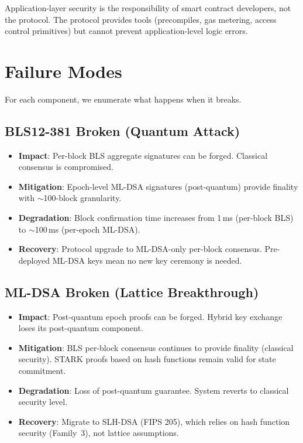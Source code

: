 \documentclass[11pt,a4paper]{article}
\begin{document}
Application-layer security is the responsibility of smart contract developers, not the
protocol. The protocol provides tools (precompiles, gas metering, access control
primitives) but cannot prevent application-level logic errors.

\section{Failure Modes}
\label{sec:failure-modes}

For each component, we enumerate what happens when it breaks.

\subsection{BLS12-381 Broken (Quantum Attack)}

\begin{itemize}[leftmargin=2em]
  \item \textbf{Impact}: Per-block BLS aggregate signatures can be forged. Classical
        consensus is compromised.
  \item \textbf{Mitigation}: Epoch-level ML-DSA signatures (post-quantum) provide
        finality with $\sim$100-block granularity.
  \item \textbf{Degradation}: Block confirmation time increases from 1\,ms (per-block
        BLS) to $\sim$100\,ms (per-epoch ML-DSA).
  \item \textbf{Recovery}: Protocol upgrade to ML-DSA-only per-block consensus.
        Pre-deployed ML-DSA keys mean no new key ceremony is needed.
\end{itemize}

\subsection{ML-DSA Broken (Lattice Breakthrough)}

\begin{itemize}[leftmargin=2em]
  \item \textbf{Impact}: Post-quantum epoch proofs can be forged. Hybrid key exchange
        loses its post-quantum component.
  \item \textbf{Mitigation}: BLS per-block consensus continues to provide finality
        (classical security). STARK proofs based on hash functions remain valid for
        state commitment.
  \item \textbf{Degradation}: Loss of post-quantum guarantee. System reverts to
        classical security level.
  \item \textbf{Recovery}: Migrate to SLH-DSA (FIPS 205), which relies on hash
        function security (Family~3), not lattice assumptions.
\end{itemize}
\end{document}
